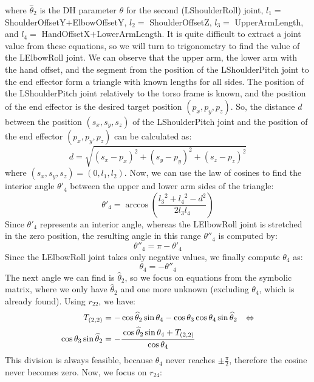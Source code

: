 where $\widehat{\theta}_2$ is the DH parameter $\theta$ for the second (LShoulderRoll) joint, $l_1 =$ ShoulderOffsetY$+$ElbowOffsetY, $l_2 =$ ShoulderOffsetZ, $l_3 =$ UpperArmLength, and $l_4 =$ HandOffsetX$+$LowerArmLength.
It is quite difficult to extract a joint value from these equations, so we will turn to trigonometry to find the value of the LElbowRoll joint. We can observe that the upper arm, the lower arm with the hand offset, and the segment from the position of the LShoulderPitch joint to the end effector form a triangle with known lengths for all sides. The position of the LShoulderPitch joint relatively to the torso frame is known, and the position of the end effector is the desired target position $(p_x,p_y,p_z)$. So, the distance $d$ between the position $(s_x,s_y,s_z)$ of the LShoulderPitch joint and the position of the end effector $(p_x,p_y,p_z)$ can be calculated as:
\[
d=\sqrt{\left(s_x-p_x\right)^2 + \left(s_y-p_y\right)^2 + \left(s_z-p_z\right)^2}
\]
where $(s_x,s_y,s_z) = (0,l_1,l_2)$.
Now, we can use the law of cosines to find the interior angle $\theta'_4$ between the upper and lower arm sides of the triangle:
\[
\theta'_4 = \arccos\left(\frac{{l_3}^2 + {l_4}^2 - d^2}{2l_3l_4}\right)
\]
Since $\theta'_4$ represents an interior angle, whereas the LElbowRoll joint is stretched in the zero position, the resulting angle in this range $\theta''_4$ is computed by:
\[
\theta''_4 = \pi - \theta'_4
\]
Since the LElbowRoll joint takes only negative values, we finally compute $\theta_4$ as:
\[
\theta_4 = - \theta''_4
\]
The next angle we can find is $\widehat{\theta}_2$, so we focus on equations from the symbolic matrix, where we only have $\widehat{\theta}_2$ and one more unknown (excluding $\theta_4$, which is already found). Using $r_{22}$, we have:
\begin{align*}
T_{(2,2)} &= -\cos\widehat{\theta}_2\sin\theta_4 - \cos\theta_3\cos\theta_4\sin\widehat{\theta}_2 &\Leftrightarrow\\
\cos\theta_3\sin\widehat{\theta}_2 &= -\cfrac{\cos\widehat{\theta}_2\sin\theta_4 + T_{(2,2)}}{\cos\theta_4}
\end{align*}
This division is always feasible, because $\theta_4$ never reaches $\pm\frac{\pi}{2}$, therefore the cosine never becomes zero. Now, we focus on $r_{24}$:
